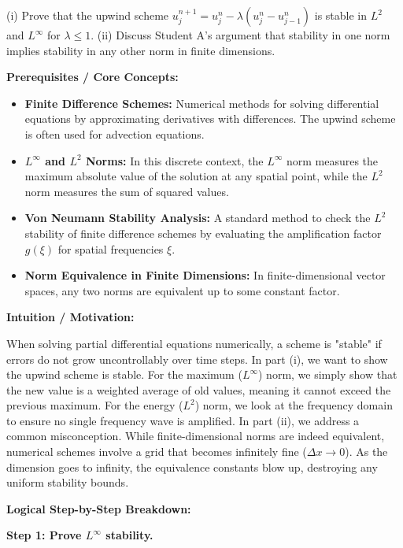 \begin{exercise}
(i) Prove that the upwind scheme $u_j^{n+1} = u_j^n - \lambda(u_j^n - u_{j-1}^n)$ is stable in $L^2$ and $L^\infty$ for $\lambda \leq 1$.
(ii) Discuss Student A's argument that stability in one norm implies stability in any other norm in finite dimensions.
\end{exercise}

\begin{solution}
\textbf{Prerequisites / Core Concepts:}
\begin{itemize}
    \item \textbf{Finite Difference Schemes:} Numerical methods for solving differential equations by approximating derivatives with differences. The upwind scheme is often used for advection equations.
    \item \textbf{$L^\infty$ and $L^2$ Norms:} In this discrete context, the $L^\infty$ norm measures the maximum absolute value of the solution at any spatial point, while the $L^2$ norm measures the sum of squared values.
    \item \textbf{Von Neumann Stability Analysis:} A standard method to check the $L^2$ stability of finite difference schemes by evaluating the amplification factor $g(\xi)$ for spatial frequencies $\xi$.
    \item \textbf{Norm Equivalence in Finite Dimensions:} In finite-dimensional vector spaces, any two norms are equivalent up to some constant factor.
\end{itemize}

\textbf{Intuition / Motivation:}

When solving partial differential equations numerically, a scheme is "stable" if errors do not grow uncontrollably over time steps. In part (i), we want to show the upwind scheme is stable. For the maximum ($L^\infty$) norm, we simply show that the new value is a weighted average of old values, meaning it cannot exceed the previous maximum. For the energy ($L^2$) norm, we look at the frequency domain to ensure no single frequency wave is amplified.
In part (ii), we address a common misconception. While finite-dimensional norms are indeed equivalent, numerical schemes involve a grid that becomes infinitely fine ($\Delta x \to 0$). As the dimension goes to infinity, the equivalence constants blow up, destroying any uniform stability bounds.

\textbf{Logical Step-by-Step Breakdown:}

\textbf{Step 1: Prove $L^\infty$ stability.}


\end{solution}
